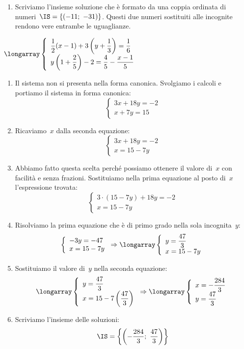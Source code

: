 \begin{enumerate}
 \item Scriviamo l'insieme soluzione che è formato da una coppia ordinata 
 di numeri~$\IS=\{(-11;~-31)\}$. Questi due numeri sostituiti alle incognite 
 rendono vere entrambe le uguaglianze.
\end{enumerate}

\begin{esempio}
$\longarray\left\{\begin{array}{l}
  \dfrac{1}{2}(x-1)+3\left(y+\dfrac{1}{3}\right)=\dfrac{1}{6}\\
  y\left(1+\dfrac{2}{5}\right)-2=\dfrac{4}{5}-\dfrac{x-1}{5}
  \end{array}\right.$

\begin{enumerate}
 \item Il sistema non si presenta nella forma canonica. Svolgiamo i calcoli e 
portiamo il sistema in forma canonica:
\[\left\{\begin{array}{l}3x+18y=-2\\x+7y=15\end{array}\right.\]

\item Ricaviamo~$x$ dalla seconda equazione:
\[\left\{\begin{array}{l}3x+18y=-2\\x=15-7y\end{array}\right.\]

\item Abbiamo fatto questa scelta perché possiamo ottenere il valore di~$x$
con facilità e senza frazioni. Sostituiamo nella prima equazione al posto di~$x$
l'espressione trovata:
\[\left\{\begin{array}{l}
          3\cdot(15-7y)+18y=-2\\
          x=15-7y
          \end{array}\right.
\]
\item Risolviamo la prima equazione che è di primo grado nella sola
incognita~$y$:
\[\left\{\begin{array}{l}
          -3y=-47\\
          x=15-7y
          \end{array}\right.
\Rightarrow\longarray\left\{\begin{array}{l}
          y=\dfrac{47}{3}\\
          x=15-7y
         \end{array}\right.\]
\item Sostituiamo il valore di~$y$ nella seconda equazione:
\[\longarray\left\{\begin{array}{l}
          y=\dfrac{47}{3}\\
          x=15-7\left(\dfrac{47}{3}\right)
          \end{array}\right.
\Rightarrow \longarray\left\{\begin{array}{l}x=-\dfrac{284}{3}\\
 y=\dfrac{47}{3}\end{array}\right.\]
\item Scriviamo l'insieme delle soluzioni:
\[\IS=\left\{\left(-\frac{284}{3};~\frac{47}{3}\right)\right\}\]
\end{enumerate}


\end{esempio}
